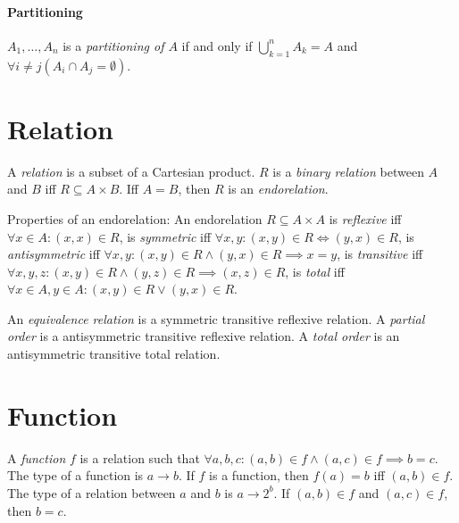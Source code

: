 \paragraph{Partitioning}
\(A_1,\ldots,A_n\) is a \emph{partitioning of \(A\)} if and only if
\(\bigcup_{k=1}^n A_k = A\) and
\(\forall i \neq j (A_i \cap A_j = \emptyset)\).

\section{Relation}

%
A \emph{relation} is a subset of a Cartesian product.
%
%
\(R\) is a \emph{binary relation} between \(A\) and \(B\) iff \(R \subseteq A \times B\).
Iff \(A = B\), then \(R\) is an \emph{endorelation}.

Properties of an endorelation:
%
%
An endorelation \(R \subseteq A \times A\) is \emph{reflexive} iff
\(\forall x \in A : (x,x) \in R\),
%
%
is \emph{symmetric} iff
\(\forall x,y: (x,y) \in R \iff (y,x) \in R\),
%
%
is \emph{antisymmetric} iff
\(\forall x,y: (x,y) \in R \wedge (y,x) \in R \implies x = y\),
%
%
is \emph{transitive} iff
\(\forall x,y,z: (x,y) \in R \wedge (y,z) \in R \implies (x,z) \in R\),
%
%
is \emph{total} iff
\(\forall x \in A , y \in A : (x,y) \in R \vee (y,x) \in R\).

%
%
An \emph{equivalence relation} is a symmetric transitive reflexive relation.
%
%
%
%
A \emph{partial order} is a antisymmetric transitive reflexive relation.
A \emph{total order} is an antisymmetric transitive total relation.

\section{Function}

%
A \emph{function} \(f\) is a relation such that
\(\forall a, b, c : (a,b) \in f \wedge (a,c) \in f \implies b = c\).
The type of a function is \(a \to b\).
If \(f\) is a function, then \(f(a) = b\) iff \((a,b) \in f\).
The type of a relation between \(a\) and \(b\) is \(a \to 2^b\).
If $(a,b) \in f$ and $(a,c) \in f$, then $b = c$.

